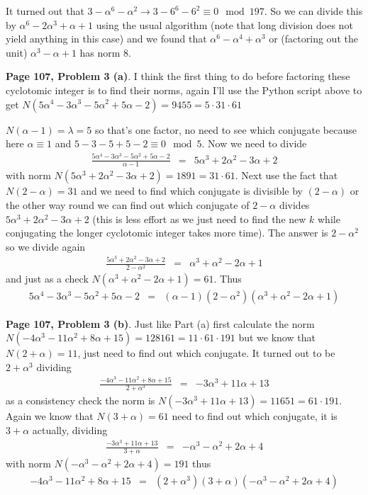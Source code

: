 \documentclass[aps,preprint,preprintnumbers,nofootinbib,showpacs,prd]{revtex4-1}
\newcommand{\nbea}{\begin{eqnarray*}}
\newcommand{\neea}{\end{eqnarray*}}
\begin{document}
It turned out that $3 - \alpha^6 - \alpha^2 \to 3 - 6^6 - 6^2 \equiv 0 \mod{197}$. So we can divide this by $\alpha^6 - 2\alpha^3 + \alpha + 1$ using the usual algorithm (note that long division does not yield anything in this case) and we found that $\alpha^6 - \alpha^4 + \alpha^3$ or (factoring out the unit) $\alpha^3 - \alpha + 1$ has norm 8.

{\bf Page 107, Problem 3 (a)}. I think the first thing to do before factoring these cyclotomic integer is to find their norms, again I'll use the Python script above to get $N(5\alpha^4 - 3\alpha^3 - 5\alpha^2 + 5\alpha - 2) = 9455 = 5 \cdot 31 \cdot 61$

$N(\alpha - 1) = \lambda = 5$ so that's one factor, no need to see which conjugate because here $\alpha \equiv 1$ and $5 - 3 - 5 + 5 - 2 \equiv 0 \mod{5}$. Now we need to divide 
%
\nbea
\frac{5\alpha^4 - 3\alpha^3 - 5\alpha^2 + 5\alpha - 2}{\alpha - 1} & = & 5\alpha^3 + 2\alpha^2 - 3\alpha + 2
\neea
%
with norm $N(5\alpha^3 + 2\alpha^2 - 3\alpha + 2) = 1891 = 31 \cdot 61$. Next use the fact that $N(2 - \alpha) = 31$ and we need to find which conjugate is divisible by $(2 - \alpha)$ or the other way round we can find out which conjugate of $2 - \alpha$ divides $5\alpha^3 + 2\alpha^2 - 3\alpha + 2$ (this is less effort as we just need to find the new $k$ while conjugating the longer cyclotomic integer takes more time). The answer is $2 - \alpha^2$ so we divide again
%
\nbea
\frac{5\alpha^3 + 2\alpha^2 - 3\alpha + 2}{2 - \alpha^2} & = & \alpha^3 + \alpha^2 - 2\alpha + 1
\neea
%
and just as a check $N(\alpha^3 + \alpha^2 - 2\alpha + 1) = 61$. Thus
%
\nbea
5\alpha^4 - 3\alpha^3 - 5\alpha^2 + 5\alpha - 2 & = & (\alpha - 1)(2 - \alpha^2)(\alpha^3 + \alpha^2 - 2\alpha + 1)
\neea
%

{\bf Page 107, Problem 3 (b)}. Just like Part (a) first calculate the norm $N(-4\alpha^3 - 11\alpha^2 + 8\alpha + 15) = 128161 = 11 \cdot 61 \cdot 191$ but we know that $N(2 + \alpha) = 11$, just need to find out which conjugate. It turned out to be $2 + \alpha^3$ dividing
%
\nbea
\frac{-4\alpha^3 - 11\alpha^2 + 8\alpha + 15}{2 + \alpha^3} & = & -3\alpha^3 + 11\alpha + 13
\neea
%
as a consistency check the norm is $N(-3\alpha^3 + 11\alpha + 13) = 11651 = 61 \cdot 191$. Again we know that $N(3 + \alpha) = 61$ need to find out which conjugate, it is $3 + \alpha$ actually, dividing
%
\nbea
\frac{-3\alpha^3 + 11\alpha + 13}{3 + \alpha} & = & -\alpha^3 - \alpha^2 + 2\alpha + 4
\neea
%
with norm $N(-\alpha^3 - \alpha^2 + 2\alpha + 4) = 191$ thus
%
\nbea
-4\alpha^3 - 11\alpha^2 + 8\alpha + 15 & = & (2 + \alpha^3)(3 + \alpha)(-\alpha^3 - \alpha^2 + 2\alpha + 4)
\neea
%
\end{document}
